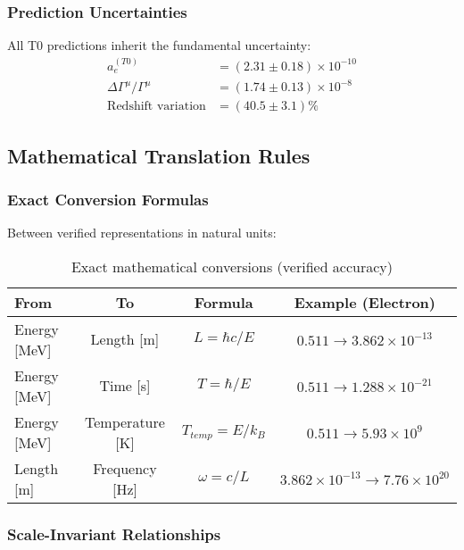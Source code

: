 \documentclass[12pt,a4paper]{article}
\begin{document}
	\subsubsection{Prediction Uncertainties}
	
	All T0 predictions inherit the fundamental uncertainty:
	\begin{align}
		a_e^{(T0)} &= (2.31 \pm 0.18) \times 10^{-10} \\
		\Delta\Gamma^{\mu}/\Gamma^{\mu} &= (1.74 \pm 0.13) \times 10^{-8} \\
		\text{Redshift variation} &= (40.5 \pm 3.1)\%
	\end{align}
	
	\subsection{Mathematical Translation Rules}
	\label{subsec:translation_rules}
	
	\subsubsection{Exact Conversion Formulas}
	
	Between verified representations in natural units:
	
	\begin{table}[htbp]
		\centering
		\caption{Exact mathematical conversions (verified accuracy)}
		\label{tab:exact_conversions}
		\begin{tabular}{lccc}
			\toprule
			\textbf{From} & \textbf{To} & \textbf{Formula} & \textbf{Example (Electron)} \\
			\midrule
			Energy [MeV] & Length [m] & $L = \hbar c/E$ & $0.511 \rightarrow 3.862 \times 10^{-13}$ \\
			Energy [MeV] & Time [s] & $T = \hbar/E$ & $0.511 \rightarrow 1.288 \times 10^{-21}$ \\
			Energy [MeV] & Temperature [K] & $T_{temp} = E/k_B$ & $0.511 \rightarrow 5.93 \times 10^9$ \\
			Length [m] & Frequency [Hz] & $\omega = c/L$ & $3.862 \times 10^{-13} \rightarrow 7.76 \times 10^{20}$ \\
			\bottomrule
		\end{tabular}
	\end{table}
	
	\subsubsection{Scale-Invariant Relationships}
	
\end{document}
